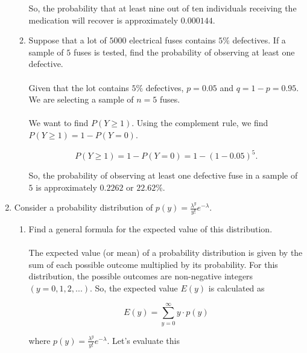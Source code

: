 \documentclass{article}
\begin{document}
\begin{enumerate}
\begin{enumerate}[label=2.\arabic*]
		            So, the probability that at least nine out of ten individuals receiving the medication will recover is approximately $0.000144$.
		      \item Suppose that a lot of $5000$ electrical fuses contains $5\%$ defectives. If a sample of $5$ fuses is tested, find the probability of observing at least one defective.
		            \\~\\
		            Given that the lot contains $5\%$ defectives, $p = 0.05$ and $q = 1 - p = 0.95$. We are selecting a sample of $n = 5$ fuses.
		            \\~\\
		            We want to find $P(Y \geq 1)$. Using the complement rule, we find $P(Y \geq 1) = 1 - P(Y = 0)$.

		            \begin{equation}
			            P(Y \geq 1) = 1 - P(Y = 0) = 1 - (1 - 0.05)^5.
		            \end{equation}

		            So, the probability of observing at least one defective fuse in a sample of $5$ is approximately $0.2262$ or $22.62\%$.
	      \end{enumerate}

	\item Consider a probability distribution of $p(y) = \frac{\lambda^y}{y!} e^{-\lambda}$.
	      \setcounter{equation}{0}
	      \begin{enumerate}[label=3.\arabic*]
		      \item Find a general formula for the expected value of this distribution.
		            \\~\\
		            The expected value (or mean) of a probability distribution is given by the sum of each possible outcome multiplied by its probability. For this distribution, the possible outcomes are non-negative integers $(y = 0, 1, 2, ...)$. So, the expected value $E(y)$ is calculated as

		            \begin{equation}
			            E(y) = \sum_{y=0}^{\infty} y \cdot p(y)
		            \end{equation}

		            where $p(y) = \frac{\lambda^y}{y!}e^{-\lambda}$. Let's evaluate this


\end{enumerate}
\end{enumerate}
\end{document}
